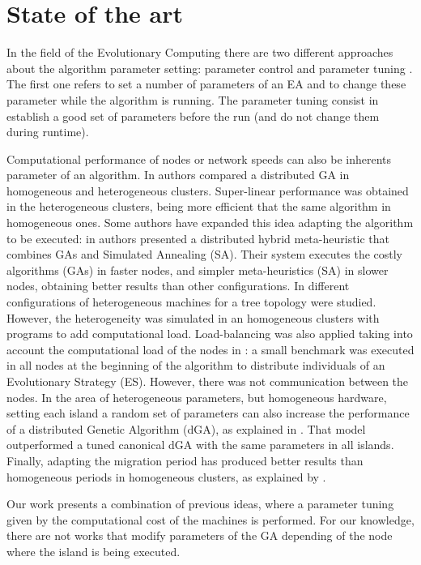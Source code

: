 %
\section{State of the art}
\label{sec:soa}
%

In the field of the Evolutionary Computing there are two different approaches about the algorithm parameter setting: parameter control and parameter tuning \cite{PARAMETERTUNING}. The first one refers to set a number of parameters of an EA and to change these parameter while the algorithm is running. The parameter tuning consist in establish a good set of parameters before the run (and do not change them during runtime).

 Computational performance of nodes or network speeds can also be inherents parameter of an algorithm. In \cite{HETEROGENEOUSHARD} authors compared a distributed GA in homogeneous and heterogeneous clusters. Super-linear performance was obtained in the heterogeneous clusters, being more efficient that the same algorithm in homogeneous ones. Some authors have expanded this idea adapting the algorithm to be executed: in \cite{HYDROCM} authors presented a distributed hybrid meta-heuristic that combines GAs and Simulated Annealing (SA). Their system executes the costly algorithms (GAs) in faster nodes, and simpler meta-heuristics (SA) in slower nodes, obtaining better results than other configurations. In \cite{HETEROGENEOUSTOPOLOGY} different configurations of heterogeneous machines for a tree topology were studied. However, the heterogeneity was simulated in an homogeneous clusters with programs to add computational load. Load-balancing was also applied taking into account the computational load of the nodes in \cite{PARALLELIMPLEMENTATION}: a small benchmark was executed in all nodes at the beginning of the algorithm to distribute individuals of an Evolutionary Strategy (ES). However, there was not communication between the nodes. In the area of heterogeneous parameters, but homogeneous hardware, setting each island a random set of parameters can also increase the performance of a distributed Genetic Algorithm (dGA), as explained in \cite{HETEROGENEOUSPARAMETERS}. That model outperformed a tuned canonical dGA with the same parameters in all islands. Finally, adapting the migration period has produced better results than homogeneous periods in homogeneous clusters, as explained by \cite{HETEROGENEOUSMIGRATION}.

 Our work presents a combination of previous ideas, where a parameter tuning given by the computational cost of the machines is performed. For our knowledge, there are not works that modify parameters of the GA depending of the node where the island is being executed.



